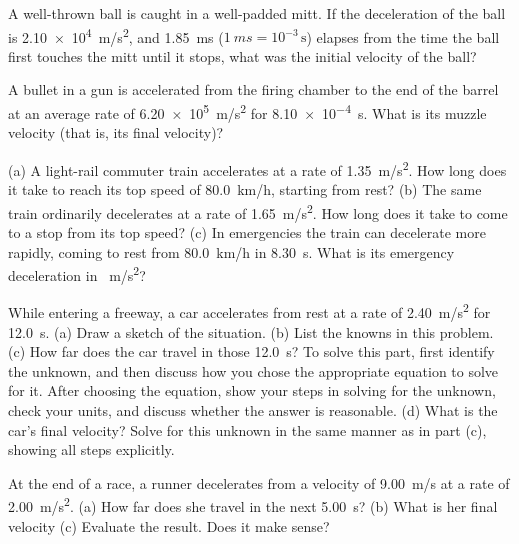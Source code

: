 \documentclass[../../main-ap-physics.tex]{subfiles}
\begin{document}
\begin{exercise}
A well-thrown ball is caught in a well-padded mitt. If the deceleration of the ball is  \SI{2.10e4}{m/s^2}, and \SI{1.85}{ms}  ($\SI{1}{ms} = 10^{-3}\,\text{s}$) elapses from the time the ball first touches the mitt until it stops, what was the initial velocity of the ball?
\end{exercise}

\begin{exercise}  
A bullet in a gun is accelerated from the firing chamber to the end of the barrel at an average rate of \SI{6.20e5}{m/s^2} for \SI{8.10e-4}{s}. What is its muzzle velocity (that is, its final velocity)?
\end{exercise}

\begin{exercise}
(a) A light-rail commuter train accelerates at a rate of \SI{1.35}{m/s^2}. How long does it take to reach its top speed of \SI{80.0}{km/h}, starting from rest? (b) The same train ordinarily decelerates at a rate of \SI{1.65}{m/s^2}. How long does it take to come to a stop from its top speed? (c) In emergencies the train can decelerate more rapidly, coming to rest from \SI{80.0}{km/h} in \SI{8.30}{s}. What is its emergency deceleration in \SI{}{m/s^2}?
\end{exercise}

\begin{exercise}
While entering a freeway, a car accelerates from rest at a rate of \SI{2.40}{m/s^2} for \SI{12.0}{s}. (a) Draw a sketch of the situation. (b) List the knowns in this problem. (c) How far does the car travel in those \SI{12.0}{s}? To solve this part, first identify the unknown, and then discuss how you chose the appropriate equation to solve for it. After choosing the equation, show your steps in solving for the unknown, check your units, and discuss whether the answer is reasonable. (d) What is the car's final velocity? Solve for this unknown in the same manner as in part (c), showing all steps explicitly.
\end{exercise}

\begin{exercise}
At the end of a race, a runner decelerates from a velocity of \SI{9.00}{m/s} at a rate of  \SI{2.00}{m/s^2}. (a) How far does she travel in the next \SI{5.00}{s}? (b) What is her final velocity (c) Evaluate the result. Does it make sense?
\end{exercise}
\end{document}
